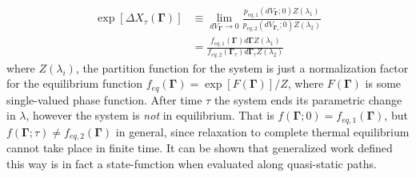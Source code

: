 \documentclass[a4paper,12pt]{article}
\begin{document}
\begin{equation}
\begin{aligned}
\label{GeneralizedWorkDef}
  \exp[\Delta X_{\tau}(\bm{\Gamma})] &\equiv \lim_{d V_{\bm{\Gamma}} \to 0} \frac{p_{eq,1} (d V_{\bm{\Gamma}};0)Z(\lambda_1)}{p_{eq,2} (d V_{\bm{\Gamma}_{\tau}};0)Z(\lambda_2)} \\
  &= \frac{f_{eq,1}(\bm{\Gamma}) d\bm{\Gamma} Z(\lambda_1)}{f_{eq,2}(\bm{\Gamma}_{\tau}) d\bm{\Gamma}_{\tau} Z(\lambda_2)}
\end{aligned}
\end{equation}
where $Z(\lambda_i)$, the partition function for the system is just a normalization factor for the equilibrium function $f_{eq}(\bm{\Gamma}) =\exp[F(\bm{\Gamma})]/Z$, where $F(\bm{\Gamma})$ is some single-valued phase function. After time $\tau$ the system ends its parametric change in $\lambda$, however the system is \textit{not} in equilibrium. That is $f(\bm{\Gamma};0)=f_{eq,1}(\bm{\Gamma})$, but $f(\bm{\Gamma};\tau)\neq f_{eq,2}(\bm{\Gamma})$ in general, since relaxation to complete thermal equilibrium cannot take place in finite time.
It can be shown that generalized work defined this way is in fact a state-function when evaluated along quasi-static paths.
\end{document}
